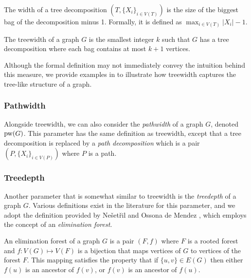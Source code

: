 \begin{definition}
    The width of a tree decomposition $(T,\{X_i\}_{i \in V(T)})$ is the size of the biggest bag of the decomposition minus 1. Formally, it is defined as $\max_{i \in V(T)} |X_i| - 1$.
\end{definition}

\begin{definition}[treewidth]
    The treewidth of a graph $G$ is the smallest integer $k$ such that $G$ has a tree decomposition where each bag contains at most $k+1$ vertices.
\end{definition}

Although the formal definition may not immediately convey the intuition behind this measure, we provide examples in  to illustrate how treewidth captures the tree-like structure of a graph.



\subsubsection*{Pathwidth}

Alongside treewidth, we can also consider the \textit{pathwidth} of a graph $G$, denoted $\text{pw}(G)$. This parameter has the same definition as treewidth, except that a tree decomposition is replaced by a \textit{path decomposition} which is a pair $(P, \{X_i\}_{i \in V(P)})$ where $P$ is a path.

\subsubsection*{Treedepth}

Another parameter that is somewhat similar to treewidth is the \textit{treedepth} of a graph $G$. Various definitions exist in the literature for this parameter, and we adopt the definition provided by Ne{\v{s}}et{\v{r}}il and Ossona de Mendez \cite{nevsetvril2006tree}, which employs the concept of an \textit{elimination forest}.

\begin{definition}
    An elimination forest of a graph $G$ is a pair $(F, f)$ where $F$ is a rooted forest and $f : V(G) \mapsto V(F)$ is a bijection that maps vertices of $G$ to vertices of the forest $F$. This mapping satisfies the property that if $\{u, v\} \in E(G)$ then either $f(u)$ is an ancestor of $f(v)$, or $f(v)$ is an ancestor of $f(u)$.
\end{definition}

